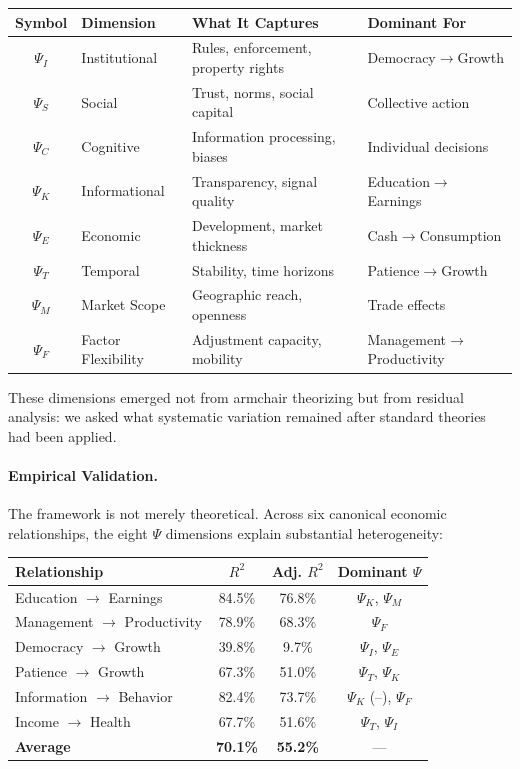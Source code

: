 \begin{center}
\begin{tabular}{@{}clll@{}}
\toprule
\textbf{Symbol} & \textbf{Dimension} & \textbf{What It Captures} & \textbf{Dominant For} \\
\midrule
$\Psi_I$ & Institutional & Rules, enforcement, property rights & Democracy$\rightarrow$Growth \\
$\Psi_S$ & Social & Trust, norms, social capital & Collective action \\
$\Psi_C$ & Cognitive & Information processing, biases & Individual decisions \\
$\Psi_K$ & Informational & Transparency, signal quality & Education$\rightarrow$Earnings \\
$\Psi_E$ & Economic & Development, market thickness & Cash$\rightarrow$Consumption \\
$\Psi_T$ & Temporal & Stability, time horizons & Patience$\rightarrow$Growth \\
$\Psi_M$ & Market Scope & Geographic reach, openness & Trade effects \\
$\Psi_F$ & Factor Flexibility & Adjustment capacity, mobility & Management$\rightarrow$Productivity \\
\bottomrule
\end{tabular}
\end{center}

These dimensions emerged not from armchair theorizing but from residual analysis: we asked what systematic variation remained after standard theories had been applied.

\paragraph{Empirical Validation.}
The framework is not merely theoretical. Across six canonical economic relationships, the eight $\Psi$ dimensions explain substantial heterogeneity:

\begin{center}
\begin{tabular}{@{}lccc@{}}
\toprule
\textbf{Relationship} & \textbf{$R^2$} & \textbf{Adj. $R^2$} & \textbf{Dominant $\Psi$} \\
\midrule
Education $\rightarrow$ Earnings & 84.5\% & 76.8\% & $\Psi_K$, $\Psi_M$ \\
Management $\rightarrow$ Productivity & 78.9\% & 68.3\% & $\Psi_F$ \\
Democracy $\rightarrow$ Growth & 39.8\% & 9.7\% & $\Psi_I$, $\Psi_E$ \\
Patience $\rightarrow$ Growth & 67.3\% & 51.0\% & $\Psi_T$, $\Psi_K$ \\
Information $\rightarrow$ Behavior & 82.4\% & 73.7\% & $\Psi_K$ (--), $\Psi_F$ \\
Income $\rightarrow$ Health & 67.7\% & 51.6\% & $\Psi_T$, $\Psi_I$ \\
\midrule
\textbf{Average} & \textbf{70.1\%} & \textbf{55.2\%} & --- \\
\bottomrule
\end{tabular}
\end{center}

